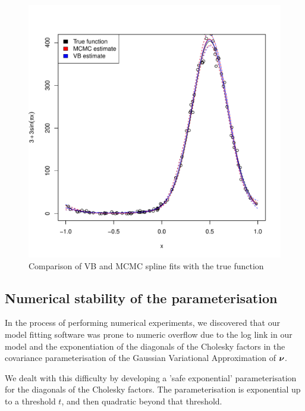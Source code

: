 \begin{figure}[h]
	\label{fig:spline}
	\caption{Comparison of VB and MCMC spline fits with the true function}
	\includegraphics[width=0.95 \textwidth]{code/results/accuracy_plots_spline_gva2.pdf}
\end{figure}
		
		
\subsection{Numerical stability of the parameterisation}

In the process of performing numerical experiments, we discovered that our
model fitting software was prone to numeric overflow due to the log link in our
model and the exponentiation of the diagonals of the Cholesky factors in the
covariance parameterisation of the Gaussian Variational Approximation of
${\boldsymbol \nu}$.

We dealt with this difficulty by developing a 'safe exponential'
parameterisation for the diagonals of the Cholesky factors. The
parameterisation is exponential up to a threshold $t$, and then quadratic
beyond that threshold.

